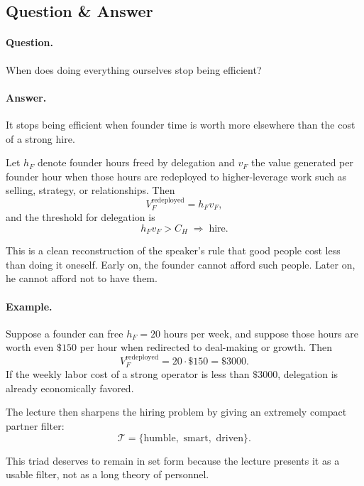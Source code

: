\subsection{Question \& Answer}

\paragraph{Question.} When does doing everything ourselves stop being efficient?

\paragraph{Answer.} It stops being efficient when founder time is worth more elsewhere than the cost of a strong hire.

Let \(h_F\) denote founder hours freed by delegation and \(v_F\) the value generated per founder hour when those hours are redeployed to higher-leverage work such as selling, strategy, or relationships. Then
\begin{equation}
V_F^{\mathrm{redeployed}} = h_F v_F,
\end{equation}
and the threshold for delegation is
\begin{equation}
h_F v_F > C_H \;\Rightarrow\; \mbox{hire}.
\end{equation}

This is a clean reconstruction of the speaker's rule that good people cost less than doing it oneself. Early on, the founder cannot afford such people. Later on, he cannot afford not to have them.

\paragraph{Example.}
Suppose a founder can free \(h_F=20\) hours per week, and suppose those hours are worth even \(\$150\) per hour when redirected to deal-making or growth. Then
\[
V_F^{\mathrm{redeployed}} = 20 \cdot \$150 = \$3000.
\]
If the weekly labor cost of a strong operator is less than \(\$3000\), delegation is already economically favored.

The lecture then sharpens the hiring problem by giving an extremely compact partner filter:
\begin{equation}
\mathcal{T}=\{\mbox{humble},\mbox{ smart},\mbox{ driven}\}.
\end{equation}

This triad deserves to remain in set form because the lecture presents it as a usable filter, not as a long theory of personnel.

